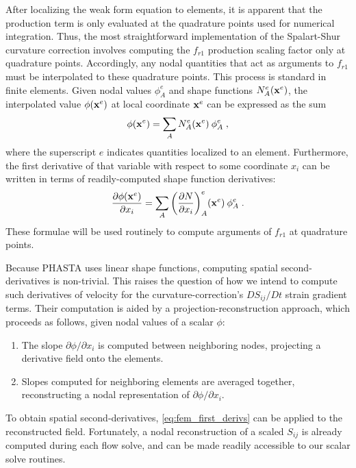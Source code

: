 \documentclass[11pt]{article}
\begin{document}
After localizing the weak form equation to elements, it is apparent that the production term is only evaluated at the quadrature points used for numerical integration. Thus, the most straightforward implementation of the Spalart-Shur curvature correction involves computing the $f_{r1}$ production scaling factor only at quadrature points. Accordingly, any nodal quantities that act as arguments to $f_{r1}$ must be interpolated to these quadrature points. This process is standard in finite elements. Given nodal values $\phi_A^e$ and shape functions $N^e_A(\mb{x}^e)$, the interpolated value $\phi(\mb{x}^e)$ at local coordinate $\mb{x}^e$ can be expressed as the sum
\begin{equation}
\phi(\mb{x}^e) = \sum_A N^e_A(\mb{x}^e) \: \phi_A^e
\;,
\end{equation}
where the superscript $e$ indicates quantities localized to an element. Furthermore, the first derivative of that variable with respect to some coordinate $x_i$ can be written in terms of readily-computed shape function derivatives:
\begin{equation}
\pp{\phi(\mb{x}^e)}{x_i} = \sum_A \left(\pp{N}{x_i}\right)^e_A \! (\mb{x}^e) \: \phi_A^e
\;.
\label{eq:fem_first_derivs}
\end{equation}
These formulae will be used routinely to compute arguments of $f_{r1}$ at quadrature points.

Because PHASTA uses linear shape functions, computing spatial second-derivatives is non-trivial. This raises the question of how we intend to compute such derivatives of velocity for the curvature-correction's $D S_{ij} / D t$ strain gradient terms.  Their computation is aided by a projection-reconstruction approach, which proceeds as follows, given nodal values of a scalar $\phi$:
\begin{enumerate}
\item The slope $\partial \phi / \partial x_i$ is computed between neighboring nodes, projecting a derivative field onto the elements.
\item Slopes computed for neighboring elements are averaged together, reconstructing a nodal representation of $\partial \phi / \partial x_i$.
\end{enumerate}
To obtain spatial second-derivatives, \eqref{eq:fem_first_derivs} can be applied to the reconstructed field. Fortunately, a nodal reconstruction of a scaled $S_{ij}$ is already computed during each flow solve, and can be made readily accessible to our scalar solve routines.
\end{document}
